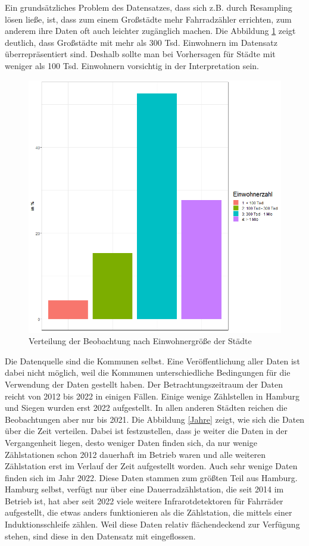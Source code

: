 \documentclass[a4paper,12pt]{thesis}
\begin{document}
Ein grundsätzliches Problem des Datensatzes, dass sich z.B. durch Resampling lösen ließe, ist, dass zum einem Großstädte mehr Fahrradzähler errichten, zum anderem ihre Daten oft auch leichter zugänglich machen. Die Abbildung \ref{Einwohnergroese} zeigt deutlich, dass Großstädte mit mehr als 300 Tsd. Einwohnern im Datensatz überrepräsentiert sind. Deshalb sollte man bei Vorhersagen für Städte mit weniger als 100 Tsd. Einwohnern vorsichtig in der Interpretation sein.

\begin{figure}[!ht]
	\centering
	\includegraphics[width=\textwidth]{Plots/plot10.png}
	\caption{Verteilung der Beobachtung nach Einwohnergröße der Städte}
	\label{Einwohnergroese}
\end{figure}

Die Datenquelle sind die Kommunen selbst. Eine Veröffentlichung aller Daten ist dabei nicht möglich, weil die Kommunen unterschiedliche Bedingungen für die Verwendung der Daten gestellt haben. Der Betrachtungszeitraum der Daten reicht von 2012 bis 2022 in einigen Fällen. Einige wenige Zählstellen in Hamburg und Siegen wurden erst 2022 aufgestellt. In allen anderen Städten reichen die Beobachtungen aber nur bis 2021. Die Abbildung \ref{Jahre} zeigt, wie sich die Daten über die Zeit verteilen. Dabei ist festzustellen, dass je weiter die Daten in der Vergangenheit liegen, desto weniger Daten finden sich, da nur wenige Zählstationen schon 2012 dauerhaft im Betrieb waren und alle weiteren Zählstation erst im Verlauf der Zeit aufgestellt worden. Auch sehr wenige Daten finden sich im Jahr 2022. Diese Daten stammen zum größten Teil aus Hamburg. Hamburg selbst, verfügt nur über eine Dauerradzählstation, die seit 2014 im Betrieb ist, hat aber seit 2022 viele weitere Infrarotdetektoren für Fahrräder aufgestellt, die etwas anders funktionieren als die Zählstation, die mittels einer Induktionsschleife zählen. Weil diese Daten relativ flächendeckend zur Verfügung stehen, sind diese in den Datensatz mit eingeflossen.
\end{document}

